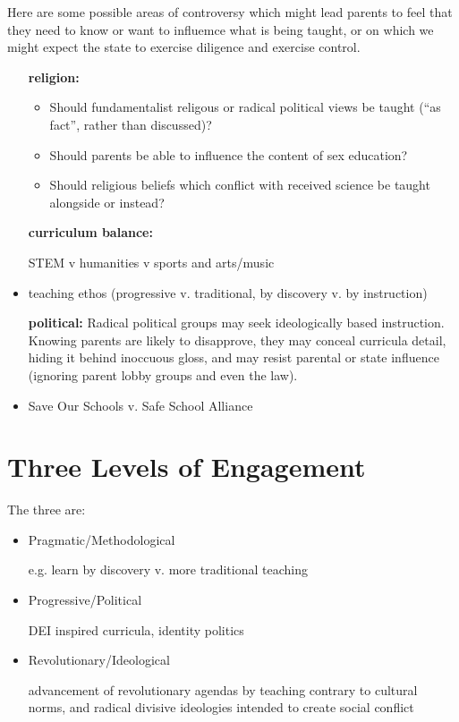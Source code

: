 \documentclass[10pt,titlepage]{book}
\begin{document}
Here are some possible areas of controversy which might lead parents to feel that they need to know or want to influemce what is being taught, or on which we might expect the state to exercise diligence and exercise control.

\begin{itemize}

\item[\bf religion:]

  \begin{itemize}
    
  \item Should fundamentalist religous or radical political views be taught (``as fact'', rather than discussed)?
  \item Should parents be able to influence the content of sex education?
    \item Should religious beliefs which conflict with received science be taught alongside or instead?
  \end{itemize}
  
\item[\bf curriculum balance:]

  STEM v humanities v sports and arts/music

  \item teaching ethos (progressive v. traditional, by discovery v. by instruction)

  \item[\bf political:]
    Radical political groups may seek ideologically based instruction.
    Knowing parents are likely to disapprove, they may conceal curricula detail, hiding it behind inoccuous gloss, and may resist parental or state influence (ignoring parent lobby groups and even the law).

    \item Save Our Schools v. Safe School Alliance
    
\end{itemize}

\section{Three Levels of Engagement}

The three are:

\begin{itemize}
\item Pragmatic/Methodological

  e.g. learn by discovery v. more traditional teaching

\item Progressive/Political

DEI inspired curricula, identity politics
  
\item Revolutionary/Ideological

  advancement of revolutionary agendas by teaching contrary to cultural norms, and radical divisive ideologies intended to create social conflict
\end{itemize}
\end{document}
